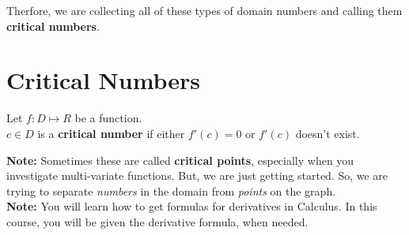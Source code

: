 \documentclass{ximera}
\begin{document}
Therfore, we are collecting all of these types of domain numbers and calling them \textbf{critical numbers}.





\section{Critical Numbers}




\begin{definition} 

Let $f: D \mapsto R$ be a function. \\
$c \in D$ is a \textbf{critical number} if  either $f'(c) = 0$ or $f'(c)$ doesn't exist.


\end{definition}


\textbf{Note:}  Sometimes these are called \textbf{critical points}, especially when you investigate multi-variate functions.  But, we are just getting started.  So, we are trying to separate \textit{numbers} in the domain from \textit{points} on the graph. \\


\textbf{Note:} You will learn how to get formulas for derivatives in Calculus.  In this course, you will be given the derivative formula, when needed. \\
\end{document}
